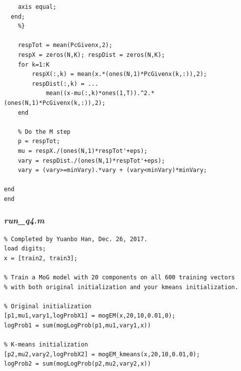\documentclass{article}
\begin{document}
\begin{lstlisting}
    axis equal;
  end;
    %}
    
    respTot = mean(PcGivenx,2);
    respX = zeros(N,K); respDist = zeros(N,K);
    for k=1:K
        respX(:,k) = mean(x.*(ones(N,1)*PcGivenx(k,:)),2);
        respDist(:,k) = ...
            mean((x-mu(:,k)*ones(1,T)).^2.*(ones(N,1)*PcGivenx(k,:)),2);
    end
    
    % Do the M step
    p = respTot;
    mu = respX./(ones(N,1)*respTot'+eps);
    vary = respDist./(ones(N,1)*respTot'+eps);
    vary = (vary>=minVary).*vary + (vary<minVary)*minVary;
    
end
end

\end{lstlisting}

\subsubsection{\emph{run\_q4.m}}
\begin{lstlisting}
% Completed by Yuanbo Han, Dec. 26, 2017.
load digits;
x = [train2, train3];

% Train a MoG model with 20 components on all 600 training vectors
% with both original initialization and your kmeans initialization.

% Original initialization
[p1,mu1,vary1,logProbX1] = mogEM(x,20,10,0.01,0);
logProb1 = sum(mogLogProb(p1,mu1,vary1,x))

% K-means initialization
[p2,mu2,vary2,logProbX2] = mogEM_kmeans(x,20,10,0.01,0);
logProb2 = sum(mogLogProb(p2,mu2,vary2,x))

\end{lstlisting}
\end{document}
